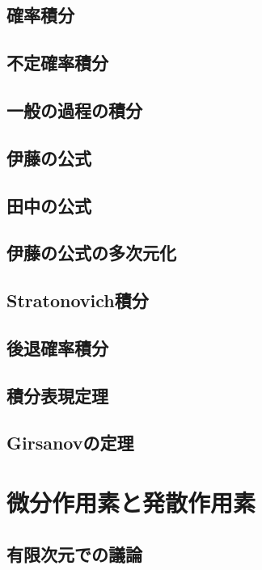 \documentclass[uplatex,dvipdfmx]{jsreport}
\begin{document}
\section{確率積分}

\section{不定確率積分}

\section{一般の過程の積分}

\section{伊藤の公式}

\section{田中の公式}

\section{伊藤の公式の多次元化}

\section{Stratonovich積分}

\section{後退確率積分}

\section{積分表現定理}

\section{Girsanovの定理}

\chapter{微分作用素と発散作用素}

\section{有限次元での議論}
\end{document}
